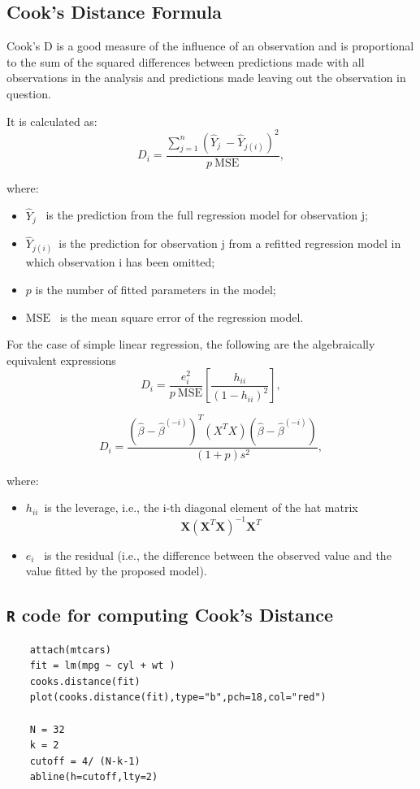 \documentclass[residuals.tex]{subfiles}
\begin{document}
\subsection*{Cook's Distance Formula}
Cook's D is a good measure of the influence of an observation and is proportional to the sum of the squared differences 
between predictions made with all observations in the analysis and predictions made leaving out the observation in question.

It is calculated as:
\[D_i = \frac{ \sum_{j=1}^n (\hat Y_j\ - \hat Y_{j(i)})^2 }{p \ \mathrm{MSE}},
\]

where:
\begin{itemize}
	\item $\hat Y_j$ \, is the prediction from the full regression model for observation j;
	\item $\hat Y_{j(i)}$\, is the prediction for observation j from a refitted regression model in which observation i has been omitted;
	\item $p$ is the number of fitted parameters in the model;
	\item $\mathrm{MSE} $ \, is the mean square error of the regression model.
	
\end{itemize}
\newpage
For the case of simple linear regression, the following are the algebraically equivalent expressions 
\[D_i = \frac{e_i^2}{p \ \mathrm{MSE}}\left[\frac{h_{ii}}{(1-h_{ii})^2}\right],
\]

\[
D_i = \frac{ (\hat \beta - \hat {\beta}^{(-i)})^T(X^TX)(\hat \beta - \hat {\beta}^{(-i)}) } {(1+p)s^2},
\]

where:
\begin{itemize}
\item $h_{ii} \,$ is the leverage, i.e., the i-th diagonal element of the hat matrix  \[\mathbf{X}\left(\mathbf{X}^T\mathbf{X}\right)^{-1}\mathbf{X}^T\]
\item $e_i$ \, is the residual (i.e., the difference between the observed value and the value fitted by the proposed model).
\end{itemize}


\bigskip
	

	\newpage
\subsection*{ \texttt{R} code for computing Cook's Distance}	
\begin{framed}
	\begin{verbatim}
	attach(mtcars)
	fit = lm(mpg ~ cyl + wt )
	cooks.distance(fit)
	plot(cooks.distance(fit),type="b",pch=18,col="red")
	
	N = 32
	k = 2
	cutoff = 4/ (N-k-1)
	abline(h=cutoff,lty=2)
	\end{verbatim}
\end{framed}
\end{document}
